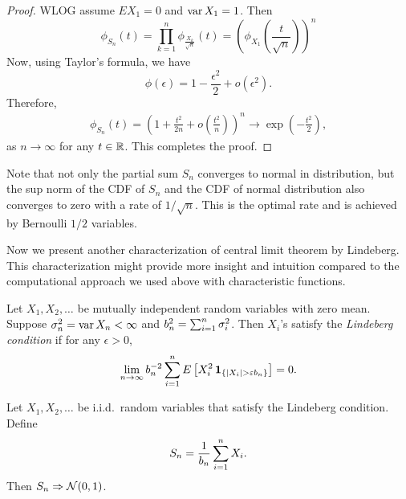 \documentclass[a4paper]{article}
\newcommand{\convd}{\Rightarrow}
\begin{document}
\begin{proof}
  WLOG assume $E X_1 = 0$ and $\operatorname{var} X_1 = 1$. Then 
  \[
  \phi_{S_n} (t) 
  = \prod_{k=1}^n \phi_{\frac{X_k}{\sqrt{n}}} (t) 
  = \left( \phi_{X_1} \left( \frac{t}{\sqrt{n}} \right) \right)^n
  \]
  Now, using Taylor's formula, we have 
  \[
  \phi (\epsilon) = 1 - \frac{\epsilon^2}{2} + o(\epsilon^2).
  \]
  Therefore, 
  \begin{align*}
    \phi_{S_n} (t) 
    = \left( 1 + \frac{t^2}{2 n} + o \left( \frac{t^2}{n} \right) \right)^n
    \to \exp \left( - \frac{t^2}{2} \right),
  \end{align*}
  as $n \to \infty$ for any $t \in \mathbb{R}$. This completes the proof.

\end{proof}

\begin{remark}
  Note that not only the partial sum $S_n$ converges to normal 
  in distribution, but the sup norm of the CDF of $S_n$ and the 
  CDF of normal distribution also converges to zero with a rate 
  of $1 / \sqrt{n}$. This is the optimal rate and is achieved by 
  Bernoulli $1/2$ variables.
\end{remark}

Now we present another characterization of central limit theorem 
by Lindeberg. This characterization might provide more insight 
and intuition compared to the computational approach we used above 
with characteristic functions.

\begin{defi}
  Let $X_1, X_2, \dots$ be mutually independent random variables 
  with zero mean. Suppose $\sigma_n^2 = \operatorname{var} X_n < \infty$ and 
  $b_n^2 = \sum_{i=1}^n 
  \sigma_i^2$. Then $X_i$'s satisfy the \emph{Lindeberg condition} 
  if for any $\epsilon > 0$,  
  \[
  \lim_{n \to \infty} b_n^{-2}
  \sum_{i=1}^n E \left[ X_i^2 \operatorname{\mathbf{1}}_{\{\left\lvert X_i\right\rvert > \varepsilon b_n\}} \right] = 0.
  \]
\end{defi}

\begin{thm}
  Let $X_1, X_2, \dots$ be i.i.d.\ random variables that satisfy
  the Lindeberg condition. Define 
  \[
  S_n = \frac{1}{b_n} \sum_{i=1}^n X_i.
  \]
  Then $S_n \convd \ncal (0, 1)$.
\end{thm}
\end{document}
